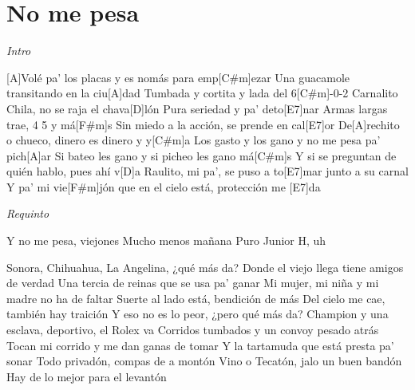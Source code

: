 \section{No me pesa}
\noindent

\vspace{1cm}
\begin{guitar}
	\begin{multicols}{2}

		\textit{Intro}
		\par
			
		[A]Volé pa' los placas y es nomás para emp[C#m]ezar
		Una guacamole transitando en la ciu[A]dad
		Tumbada y cortita y lada del 6[C#m]-0-2
		Carnalito Chila, no se raja el chava[D]lón
		Pura seriedad y pa' deto[E7]nar
		Armas largas trae, 4 5 y má[F#m]s
		Sin miedo a la acción, se prende en cal[E7]or
		De[A]rechito o chueco, dinero es dinero y y[C#m]a
		Los gasto y los gano y no me pesa pa' pich[A]ar
		Si bateo les gano y si picheo les gano má[C#m]s
		Y si se preguntan de quién hablo, pues ahí v[D]a
		Raulito, mi pa', se puso a to[E7]mar junto a su carnal
		Y pa' mi vie[F#m]jón que en el cielo está, protección me [E7]da

		\par

		\textit{Requinto}
		\par
		Y no me pesa, viejones
		Mucho menos mañana
		Puro Junior H, uh
		\par
		Sonora, Chihuahua, La Angelina, ¿qué más da?
		Donde el viejo llega tiene amigos de verdad
		Una tercia de reinas que se usa pa' ganar
		Mi mujer, mi niña y mi madre no ha de faltar
		Suerte al lado está, bendición de más
		Del cielo me cae, también hay traición
		Y eso no es lo peor, ¿pero qué más da?
		Champion y una esclava, deportivo, el Rolex va
		Corridos tumbados y un convoy pesado atrás
		Tocan mi corrido y me dan ganas de tomar
		Y la tartamuda que está presta pa' sonar
		Todo privadón, compas de a montón
		Vino o Tecatón, jalo un buen bandón
		Hay de lo mejor para el levantón

	\end{multicols}
\end{guitar}

